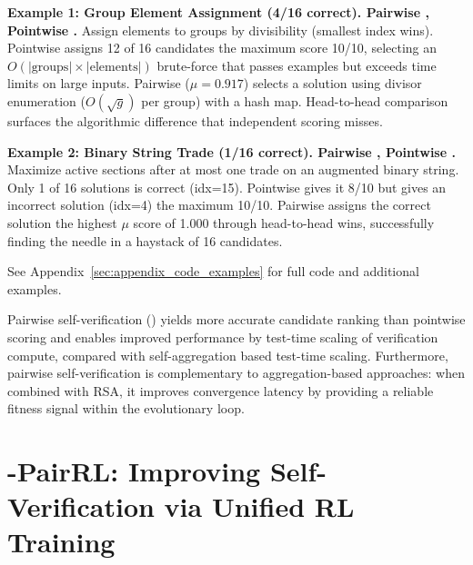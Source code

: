 \begin{tcolorbox}[
    colback=blue!2,
    colframe=blue!15,
    breakable,
    enhanced
]
\small
\textbf{Example 1: Group Element Assignment (4/16 correct). Pairwise \checkmark, Pointwise .}
Assign elements to groups by divisibility (smallest index wins).
Pointwise assigns 12 of 16 candidates the maximum score 10/10, selecting an $O(|\text{groups}| {\times} |\text{elements}|)$ brute-force that passes examples but exceeds time limits on large inputs. Pairwise ($\mu{=}0.917$) selects a solution using divisor enumeration ($O(\sqrt{g})$ per group) with a hash map. Head-to-head comparison surfaces the algorithmic difference that independent scoring misses.

\vspace{0.5em}
\textbf{Example 2: Binary String Trade (1/16 correct). Pairwise \checkmark, Pointwise .}
Maximize active sections after at most one trade on an augmented binary string.
Only 1 of 16 solutions is correct (idx=15). Pointwise gives it 8/10 but gives an incorrect solution (idx=4) the maximum 10/10. Pairwise assigns the correct solution the highest $\mu$ score of 1.000 through head-to-head wins, successfully finding the needle in a haystack of 16 candidates.

\vspace{0.3em}
{\footnotesize See Appendix~\ref{sec:appendix_code_examples} for full code and additional examples.}
\end{tcolorbox}

\begin{tcolorbox}[title=Takeaway: Improved Self-Verification and Test-Time Scaling with \pairinfer{}, colback=green!5]
Pairwise self-verification (\pairinfer{}) yields more accurate candidate ranking than pointwise scoring and enables improved performance by test-time scaling of verification compute, compared with self-aggregation based test-time scaling. Furthermore, pairwise self-verification is complementary to aggregation-based approaches: when combined with RSA, it improves convergence latency by providing a reliable fitness signal within the evolutionary loop.
\end{tcolorbox}


\section{\method{}-PairRL: Improving Self-Verification via Unified RL Training}
\label{sec:unified_rl}


